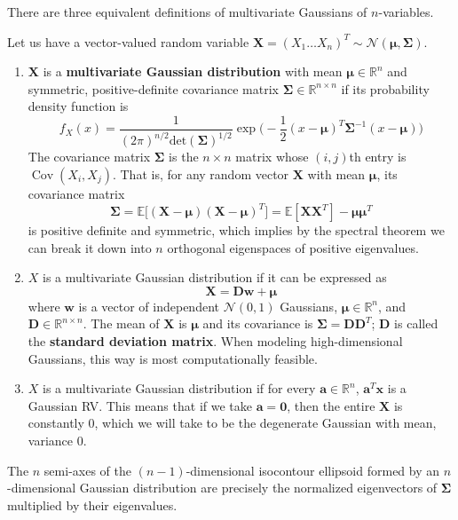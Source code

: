 \documentclass{article}
\DeclareMathOperator{\Cov}{Cov}
\begin{document}
  There are three equivalent definitions of multivariate Gaussians of $n$-variables. 

  \begin{definition}
  Let us have a vector-valued random variable $\mathbf{X} = (X_1 \ldots X_n)^T \sim \mathcal{N}(\boldsymbol{\mu}, \boldsymbol{\Sigma})$. 
  \begin{enumerate}
      \item $\mathbf{X}$ is a \textbf{multivariate Gaussian distribution} with mean $\boldsymbol{\mu} \in \mathbb{R}^n$ and symmetric, positive-definite covariance matrix $\boldsymbol{\Sigma} \in \mathbb{R}^{n \times n}$ if its probability density function is
      \[f_X (x) = \frac{1}{(2\pi)^{n/2} \mathrm{det}(\boldsymbol{\Sigma})^{1/2}} \exp\bigg( -\frac{1}{2} (x-\boldsymbol{\mu})^T \boldsymbol{\Sigma}^{-1} (x - \boldsymbol{\mu})\bigg)\]
      The covariance matrix $\boldsymbol{\Sigma}$ is the $n \times n$ matrix whose $(i, j)$th entry is $\Cov(X_i, X_j)$. That is, for any random vector $\mathbf{X}$ with mean $\boldsymbol{\mu}$, its covariance matrix 
      \[\boldsymbol{\Sigma} = \mathbb{E}\big[ (\mathbf{X} - \boldsymbol{\mu}) (\mathbf{X} - \boldsymbol{\mu})^T \big] = \mathbb{E}[\mathbf{X} \mathbf{X}^T] - \boldsymbol{\mu} \boldsymbol{\mu}^T\]
      is positive definite and symmetric, which implies by the spectral theorem we can break it down into $n$ orthogonal eigenspaces of positive eigenvalues. 

      \item $X$ is a multivariate Gaussian distribution if it can be expressed as 
      \[\mathbf{X} = \mathbf{D} \mathbf{w} + \boldsymbol{\mu}\]
      where $\mathbf{w}$ is a vector of independent $\mathcal{N}(0, 1)$ Gaussians, $\boldsymbol{\mu} \in \mathbb{R}^n$, and $\mathbf{D} \in \mathbb{R}^{n \times n}$. The mean of $\mathbf{X}$ is $\boldsymbol{\mu}$ and its covariance is $\boldsymbol{\Sigma} = \mathbf{D} \mathbf{D}^T$; $\mathbf{D}$ is called the \textbf{standard deviation matrix}. When modeling high-dimensional Gaussians, this way is most computationally feasible. 

      \item $X$ is a multivariate Gaussian distribution if for every $\mathbf{a} \in \mathbb{R}^n$, $\mathbf{a}^T \mathbf{x}$ is a Gaussian RV. This means that if we take $\mathbf{a} = \mathbf{0}$, then the entire $\mathbf{X}$ is constantly $0$, which we will take to be the degenerate Gaussian with mean, variance $0$. 
  \end{enumerate}
  The $n$ semi-axes of the $(n-1)$-dimensional isocontour ellipsoid formed by an $n$-dimensional Gaussian distribution are precisely the normalized eigenvectors of $\boldsymbol{\Sigma}$ multiplied by their eigenvalues. 
  \end{definition}
\end{document}
